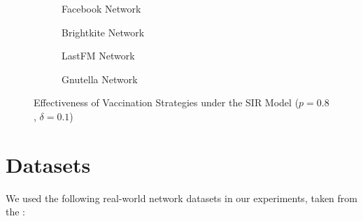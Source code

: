 \documentclass[9pt]{extarticle}
\begin{document}
\begin{figure}[H]
    \centering
    \begin{subfigure}{0.45\linewidth}
        \resizebox{\linewidth}{!}{}
        \caption{Facebook Network}
        \label{fig:facebook_sir}
    \end{subfigure}
    \hfill
    \begin{subfigure}{0.45\linewidth}
        \resizebox{\linewidth}{!}{}
        \caption{Brightkite Network}
        \label{fig:brightkite_sir}
    \end{subfigure}

    \vspace{0.5cm}

    \begin{subfigure}{0.45\linewidth}
        \resizebox{\linewidth}{!}{}
        \caption{LastFM Network}
        \label{fig:lastfm_sir}
    \end{subfigure}
    \hfill
    \begin{subfigure}{0.45\linewidth}
        \resizebox{\linewidth}{!}{}
        \caption{Gnutella Network}
        \label{fig:gnutella_sir}
    \end{subfigure}
    \caption{Effectiveness of Vaccination Strategies under the SIR Model ($p = 0.8$, $\delta = 0.1$)}
    \label{fig:sir_results}
\end{figure}

\section{Datasets}
\label{sec:datasets}

We used the following real-world network datasets in our experiments, taken from the \cite[Stanford Network Analysis Project (SNAP)]{snapnets}:
\end{document}
